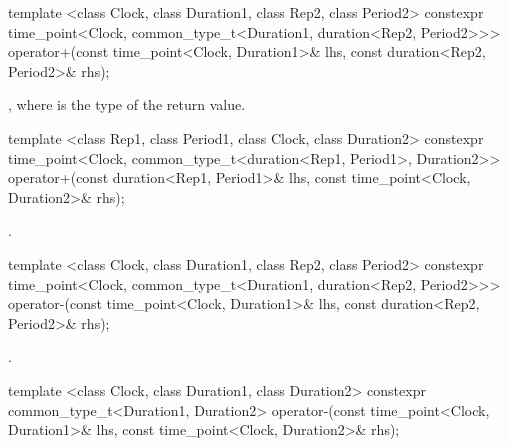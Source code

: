 %
%
%
%
\begin{itemdecl}
template <class Clock, class Duration1, class Rep2, class Period2>
  constexpr time_point<Clock, common_type_t<Duration1, duration<Rep2, Period2>>>
  operator+(const time_point<Clock, Duration1>& lhs, const duration<Rep2, Period2>& rhs);
\end{itemdecl}

\begin{itemdescr}
\pnum
\returns {}, where  is the type of the return value.
\end{itemdescr}

%
%
%
%
\begin{itemdecl}
template <class Rep1, class Period1, class Clock, class Duration2>
  constexpr time_point<Clock, common_type_t<duration<Rep1, Period1>, Duration2>>
  operator+(const duration<Rep1, Period1>& lhs, const time_point<Clock, Duration2>& rhs);
\end{itemdecl}

\begin{itemdescr}
\pnum
\returns {}.
\end{itemdescr}

%
%
%
%
\begin{itemdecl}
template <class Clock, class Duration1, class Rep2, class Period2>
  constexpr time_point<Clock, common_type_t<Duration1, duration<Rep2, Period2>>>
  operator-(const time_point<Clock, Duration1>& lhs, const duration<Rep2, Period2>& rhs);
\end{itemdecl}

\begin{itemdescr}
\pnum
\returns {}.
\end{itemdescr}

%
%
\begin{itemdecl}
template <class Clock, class Duration1, class Duration2>
  constexpr common_type_t<Duration1, Duration2>
  operator-(const time_point<Clock, Duration1>& lhs, const time_point<Clock, Duration2>& rhs);
\end{itemdecl}

